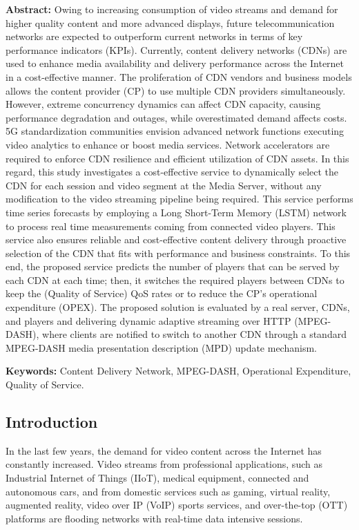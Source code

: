 \textbf{Abstract:} Owing to increasing consumption of video streams and demand for higher quality content and more advanced displays, future telecommunication networks are expected to outperform current networks in terms of key performance indicators (KPIs). Currently, content delivery networks (CDNs) are used to enhance media availability and delivery performance across the Internet in a cost-effective manner. The proliferation of CDN vendors and business models allows the content provider (CP) to use multiple CDN providers simultaneously. However, extreme concurrency dynamics can affect CDN capacity, causing performance degradation and outages, while overestimated demand affects costs. 5G standardization communities envision advanced network functions executing video analytics to enhance or boost media services. Network accelerators are required to enforce CDN resilience and efficient utilization of CDN assets. In this regard, this study investigates a cost-effective service to dynamically select the CDN for each session and video segment at the Media Server, without any modification to the video streaming pipeline being required. This service performs time series forecasts by employing a Long Short-Term Memory (LSTM) network to process real time measurements coming from connected video players. This service also ensures reliable and cost-effective content delivery through proactive selection of the CDN that fits with performance and business constraints. To this end, the proposed service predicts the number of players that can be served by each CDN at each time; then, it switches the required players between CDNs to keep the (Quality of Service) QoS rates or to reduce the CP's operational expenditure (OPEX). The proposed solution is evaluated by a real server, CDNs, and players and delivering dynamic adaptive streaming over HTTP (MPEG-DASH), where clients are notified to switch to another CDN through a standard MPEG-DASH media presentation description (MPD) update mechanism.

\textbf{Keywords:} Content Delivery Network, MPEG-DASH, Operational Expenditure, Quality of Service.


\subsection{Introduction}
\label{sec:intro}

In the last few years, the demand for video content across the Internet has constantly increased. Video streams from professional applications, such as Industrial Internet of Things (IIoT), medical equipment, connected and autonomous cars, and from domestic services such as gaming, virtual reality, augmented reality, video over IP (VoIP) sports services, and  over-the-top (OTT) platforms are flooding networks with real-time data intensive sessions.


